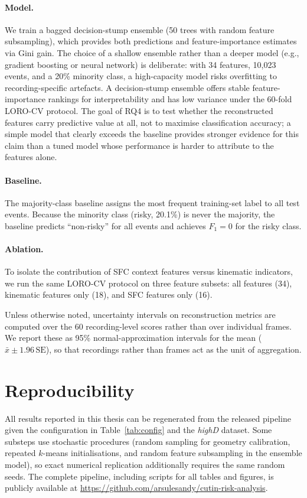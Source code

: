 \documentclass[12pt,a4paper,twoside,openright]{report}
\newcommand{\ArtifactURL}{\url{https://github.com/arsulesandy/cutin-risk-analysis}}
\begin{document}
    \paragraph{Model.}
    We train a bagged decision-stump ensemble (50 trees with random feature subsampling), which provides both predictions and feature-importance estimates via Gini gain. The choice of a shallow ensemble rather than a deeper model (e.g., gradient boosting or neural network) is deliberate: with 34 features, 10,023 events, and a 20\% minority class, a high-capacity model risks overfitting to recording-specific artefacts. A decision-stump ensemble offers stable feature-importance rankings for interpretability and has low variance under the 60-fold LORO-CV protocol. The goal of RQ4 is to test whether the reconstructed features carry predictive value at all, not to maximise classification accuracy; a simple model that clearly exceeds the baseline provides stronger evidence for this claim than a tuned model whose performance is harder to attribute to the features alone.

    \paragraph{Baseline.}
    The majority-class baseline assigns the most frequent training-set label to all test events. Because the minority class (risky, 20.1\%) is never the majority, the baseline predicts ``non-risky'' for all events and achieves $F_1 = 0$ for the risky class.

    \paragraph{Ablation.}
    To isolate the contribution of SFC context features versus kinematic indicators, we run the same LORO-CV protocol on three feature subsets: all features (34), kinematic features only (18), and SFC features only (16).

    Unless otherwise noted, uncertainty intervals on reconstruction metrics are computed over the 60 recording-level scores rather than over individual frames. We report these as 95\% normal-approximation intervals for the mean ($\bar{x} \pm 1.96\,\mathrm{SE}$), so that recordings rather than frames act as the unit of aggregation.

    \section{Reproducibility}
    All results reported in this thesis can be regenerated from the released pipeline given the configuration in Table~\ref{tab:config} and the \textit{highD} dataset. Some substeps use stochastic procedures (random sampling for geometry calibration, repeated $k$-means initialisations, and random feature subsampling in the ensemble model), so exact numerical replication additionally requires the same random seeds. The complete pipeline, including scripts for all tables and figures, is publicly available at \ArtifactURL.
\end{document}
